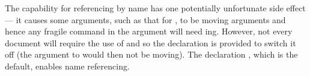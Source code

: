     The capability for referencing by name has one potentially
unfortunate side effect --- it causes some arguments, such as that
for \cmd{\legend}, to be moving arguments 
and hence any fragile command
in the argument will need \cmd{\protect}ing. However, not every document
will require the use of \cmd{\titleref} and so the declaration
\cmd{\namerefoff} is provided to switch it off (the argument to
\cmd{\legend} would then not be moving). The declaration
\cmd{\namerefon}, which is the default, enables name referencing.



